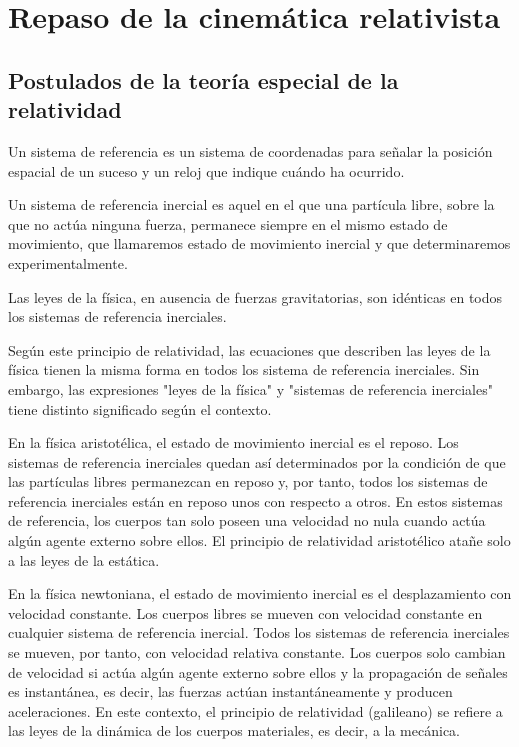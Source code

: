 \setchapterpreamble[u]{\margintoc}
\chapter{Repaso de la cinemática relativista}


\section{Postulados de la teoría especial de la relatividad}

Un sistema de referencia es un sistema de coordenadas para señalar la posición espacial de un suceso y un reloj que indique cuándo ha ocurrido.

Un sistema de referencia inercial es aquel en el que una partícula libre, sobre la que no actúa ninguna fuerza, permanece siempre en el mismo estado de movimiento, que llamaremos estado de movimiento inercial y que determinaremos experimentalmente.

\begin{proposition}
  Las leyes de la física, en ausencia de fuerzas gravitatorias, son idénticas en todos los sistemas de referencia inerciales.
\end{proposition}

Según este principio de relatividad, las ecuaciones que describen las leyes de la física tienen la misma forma en todos los sistema de referencia inerciales. Sin embargo, las expresiones "leyes de la física" y "sistemas de referencia inerciales" tiene distinto significado según el contexto.

En la física aristotélica, el estado de movimiento inercial es el reposo. Los sistemas de referencia inerciales quedan así determinados por la condición de que las partículas libres permanezcan en reposo y, por tanto, todos los sistemas de referencia inerciales están en reposo unos con respecto a otros. En estos sistemas de referencia, los cuerpos tan solo poseen una velocidad no nula cuando actúa algún agente externo sobre ellos. El principio de relatividad aristotélico atañe solo a las leyes de la estática.

En la física newtoniana, el estado de movimiento inercial es el desplazamiento con velocidad constante. Los cuerpos libres se mueven con velocidad constante en cualquier sistema de referencia inercial. Todos los sistemas de referencia inerciales se mueven, por tanto, con velocidad relativa constante. Los cuerpos solo cambian de velocidad si actúa algún agente externo sobre ellos y la propagación de señales es instantánea, es decir, las fuerzas actúan instantáneamente y producen aceleraciones. En este contexto, el principio de relatividad (galileano) se refiere a las leyes de la dinámica de los cuerpos materiales, es decir, a la mecánica.

